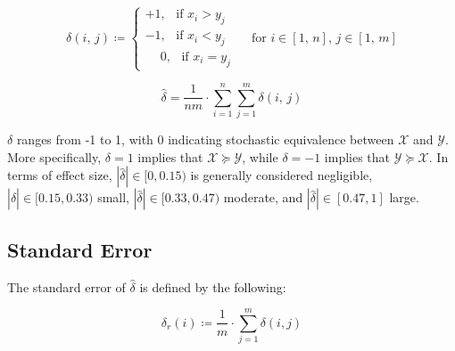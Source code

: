 \documentclass[pdflatex,sn-mathphys-num]{sn-jnl}
\theoremstyle{thmstyleone}
\theoremstyle{thmstyletwo}
\theoremstyle{thmstylethree}
\begin{document}
            \begin{equation}
                \delta \left( i, \, j \right) \coloneqq \begin{cases} 
                    +1, \hspace{5pt} \text{ if } x_{i} > y_{j} \\
                    -1, \hspace{5pt} \text{ if } x_{i} < y_{j} \\
                    \phantom{+}0, \hspace{5pt} \text{ if } x_{i} = y_{j}
                \end{cases} \hspace{15pt} \text{for } i \in \left[ 1, \, n \right], \, j \in \left[ 1, \, m \right]
            \end{equation}

            \vspace{10pt}

            \begin{equation}
                \hat{\delta} = \frac{1}{nm} \cdot \sum_{i = 1}^{n} \sum_{j = 1}^{m} \delta \left( i, \, j \right)
            \end{equation}

            \vspace{10pt}

           \noindent $\delta$ ranges from -1 to 1, with 0 indicating stochastic equivalence between $\mathcal{X}$ and $\mathcal{Y}$. More specifically, $\delta = 1$ implies that $\mathcal{X} \succeq \mathcal{Y}$, while $\delta = -1$ implies that $\mathcal{Y} \succeq \mathcal{X}$. In terms of effect size, $|\hat{\delta}| \in [0, 0.15)$ is generally considered negligible, $|\hat{\delta}| \in [0.15, 0.33)$ small, $|\hat{\delta}| \in [0.33, 0.47)$ moderate, and $| \hat{\delta}| \in [0.47, 1]$ large.

        \vspace{10pt}

       \subsection{Standard Error}

            The standard error of $\hat{\delta}$ is defined by the following:

            \begin{equation}
                \delta_{r}(i) \coloneqq \frac{1}{m} \cdot \sum_{j=1}^{m} \delta \left( i, j \right)
            \end{equation}
\end{document}
